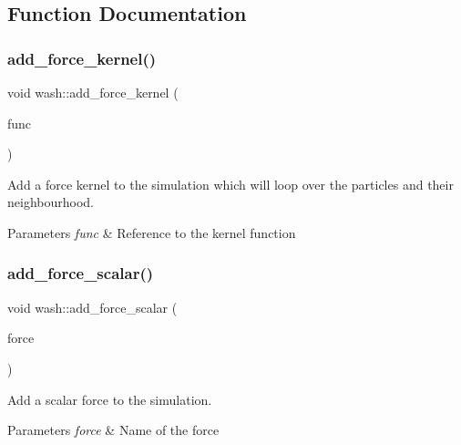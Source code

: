 \subsection{Function Documentation}
\mbox{\label{namespacewash_a2ffa21a9e32d3ca6ce87def3e7db4837}} 
\subsubsection{\texorpdfstring{add\+\_\+force\+\_\+kernel()}{add\_force\_kernel()}}
{\footnotesize\ttfamily void wash\+::add\+\_\+force\+\_\+kernel (\begin{DoxyParamCaption}\item[{const \mbox{\hyperlink{namespacewash_a3687ea698f8cb8c077d728e5d74de495}{Force\+FuncT}}}]{func }\end{DoxyParamCaption})}



Add a force kernel to the simulation which will loop over the particles and their neighbourhood. 


\begin{DoxyParams}{Parameters}
{\em func} & Reference to the kernel function \\
\hline
\end{DoxyParams}
\mbox{\label{namespacewash_a6103b7efdcc3045c8d2aae4d5598e7ae}} 
\subsubsection{\texorpdfstring{add\+\_\+force\+\_\+scalar()}{add\_force\_scalar()}}
{\footnotesize\ttfamily void wash\+::add\+\_\+force\+\_\+scalar (\begin{DoxyParamCaption}\item[{const std\+::string}]{force }\end{DoxyParamCaption})}



Add a scalar force to the simulation. 


\begin{DoxyParams}{Parameters}
{\em force} & Name of the force \\
\hline
\end{DoxyParams}
\mbox{\label{namespacewash_a9f85f4ec09db604cb09806616365a5b8}} 
